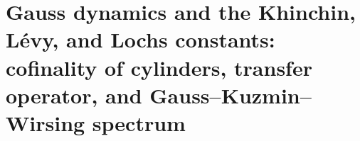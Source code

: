 \chapter{Gauss dynamics and the Khinchin, Lévy, and Lochs constants: cofinality of cylinders, transfer operator, and Gauss--Kuzmin--Wirsing spectrum}
\label{chap:p3-final:44:gauss_khinchin_levy_lochs}


